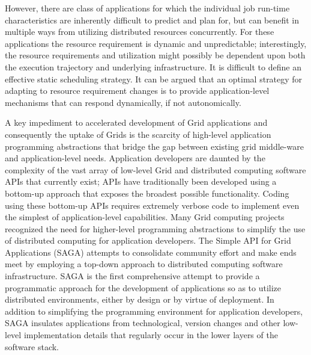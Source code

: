\documentclass{sig-alternate}
\newcommand{\jhanote}[1]{ {\textcolor{red} { ***Jha: #1 }}}
\newcommand{\yyenote}[1]{ {\textcolor{blue} { ***yye00: #1 }}}
\newcommand{\jhanote}[1]{}
\newcommand{\yyenote}[1]{}
\begin{document}
However, there are class of applications for which the individual job run-time characteristics are inherently difficult to predict and plan for, but can benefit in multiple ways from utilizing distributed resources concurrently. For these applications the resource requirement is dynamic and unpredictable; interestingly, the resource requirements and utilization might possibly be dependent upon both the execution trajectory and underlying infrastructure. %
It is difficult to define an effective static scheduling strategy.
It can be argued that an optimal strategy for adapting to resource requirement changes is to provide application-level mechanisms that can respond dynamically, if not autonomically.


A key impediment to accelerated development of Grid applications and
consequently the uptake of Grids is the scarcity of high-level
application programming abstractions that bridge the gap between
existing grid middle-ware and application-level needs.  Application
developers are daunted by the complexity of the vast array of
low-level Grid and distributed computing software APIs that currently
exist; APIs have traditionally been developed using a bottom-up
approach that exposes the broadest possible functionality.  Coding
using these bottom-up APIs requires extremely verbose code to
implement even the simplest of application-level capabilities.  Many
Grid computing projects~\cite{realitygrid, gat, cog} recognized the
need for higher-level programming abstractions to simplify the use of
distributed computing for application developers.  The Simple API for
Grid Applications (SAGA) attempts to consolidate community effort and
make ends meet by employing a top-down approach to distributed
computing software infrastructure.  SAGA is the first comprehensive
attempt to provide a programmatic approach for the development of
applications so as to utilize distributed environments, either by
design or by virtue of deployment.  In addition to simplifying the
programming environment for application developers, SAGA insulates
applications from technological, version changes and other low-level
implementation details that regularly occur in the lower layers of the
software stack.
\end{document}
